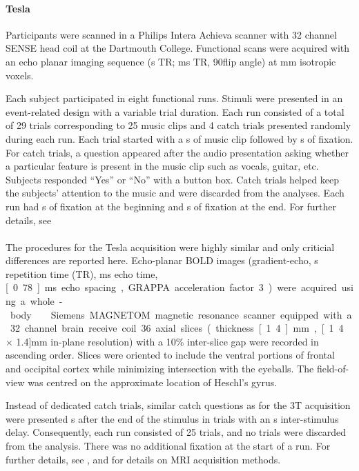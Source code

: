 \paragraph{\unit[3]{Tesla}}
%
Participants were scanned in a Philips Intera Achieva scanner with 32 channel
SENSE head coil at the Dartmouth College. Functional scans were acquired with
an echo planar imaging sequence (\unit[2]{s} TR; \unit[35]{ms} TR,
90\textdegree flip angle) at \unit[3]{mm} isotropic voxels.

Each subject participated in eight functional runs. Stimuli were presented in
an event-related design with a variable trial duration. Each run consisted of a
total of 29 trials corresponding to 25 music clips and 4 catch trials presented
randomly during each run. Each trial started with a \unit[6]{s} of music clip
followed by \unit[4-8]{s} of fixation. For catch trials, a question appeared
after the audio presentation asking whether a particular feature is present in
the music clip such as vocals, guitar, etc. Subjects responded “Yes” or “No”
with a button box. Catch trials helped keep the subjects’ attention to the
music and were discarded from the analyses. Each run had \unit[4]{s} of
fixation at the beginning and \unit[10]{s} of fixation at the end. For further
details, see \citet{CTK+2012}

\paragraph{\sevenT}
%
The procedures for the \unit[7]{Tesla} acquisition were highly similar and only
criticial differences are reported here. Echo-planar BOLD images
(gradient-echo, \unit[2]{s} repetition time (TR), \unit[22]{ms} echo time,
\unit[0.78]{ms} echo spacing, GRAPPA acceleration factor 3) were acquired using
a whole-body \sevenT\ Siemens MAGNETOM magnetic resonance scanner equipped with
a 32 channel brain receive coil. 36 axial slices (thickness \unit[1.4]{mm},
\unit[1.4 $\times$ 1.4]{mm} in-plane resolution) with a 10\% inter-slice gap
were recorded in ascending order.  Slices were oriented to include the ventral
portions of frontal and occipital cortex while minimizing intersection with the
eyeballs. The field-of-view was centred on the approximate location of Heschl's
gyrus.

Instead of dedicated catch trials, similar catch questions as for the 3T
acquisition were presented \unit[4]{s} after the end of the stimulus in
trials with an \unit[8]{s} inter-stimulus delay. Consequently, each run
consisted of 25 trials, and no trials were discarded from the analysis.  There
was no additional fixation at the start of a run. For further details, see
\citet{HDH+2015}, and \citet{HBI+14} for details on MRI acquisition methods.


